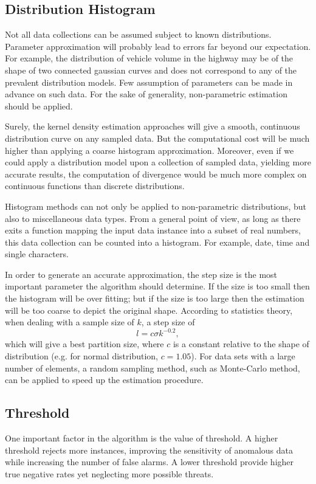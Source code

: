 \documentclass[10pt,conference,letterpaper]{IEEEtran}
\begin{document}
		\subsection{Distribution Histogram}\label{sec:alg-histogram}
			Not all data collections can be assumed subject to known distributions. Parameter approximation will probably lead to errors far beyond our expectation. For example, the distribution of vehicle volume in the highway may be of the shape of two connected gaussian curves and does not correspond to any of the prevalent distribution models. Few assumption of parameters can be made in advance on such data. For the sake of generality, non-parametric estimation should be applied.
			
			Surely, the kernel density estimation approaches will give a smooth, continuous distribution curve on any sampled data. But the computational cost will be much higher than applying a coarse histogram approximation.
			Moreover, even if we could apply a distribution model upon a collection of sampled data, yielding more accurate results, the computation of divergence would be much more complex on continuous functions than discrete distributions.
			
			Histogram methods can not only be applied to non-parametric distributions, but also to miscellaneous data types. From a general point of view, as long as there exits a function mapping the input data instance into a subset of real numbers, this data collection can be counted into a histogram. For example, date, time and single characters.
	
			In order to generate an accurate approximation, the step size is the most important parameter the algorithm should determine. If the size is too small then the histogram will be over fitting; but if the size is too large then the estimation will be too coarse to depict the original shape. According to statistics theory, when dealing with a sample size of $k$, a step size of 
			\begin{equation}\label{equ:step-size}
				l = c \sigma k^{-0.2},
			\end{equation}
			which will give a best partition size, where $c$ is a constant relative to the shape of distribution (e.g. for normal distribution, $c=1.05$). For data sets with a large number of elements, a random sampling method, such as Monte-Carlo method, can be applied to speed up the estimation procedure.
	
		\subsection{Threshold}\label{sec:alg-threshold}
			One important factor in the algorithm is the value of threshold. A higher threshold rejects more instances, improving the sensitivity of anomalous data while increasing the number of false alarms. A lower threshold provide higher true negative rates yet neglecting more possible threats.
			
\end{document}
